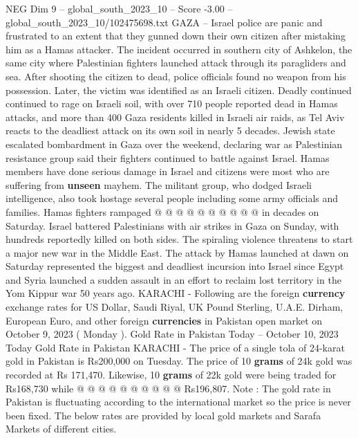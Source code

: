 \begin{textsample}{NEG Dim 9 – global\_south\_2023\_10 – Score -3.00 – global\_south\_2023\_10/102475698.txt}  \label{ex:f9_neg_416}
GAZA -- Israel police are panic and frustrated to an extent that they gunned down their own citizen after mistaking him as a Hamas attacker.
The incident occurred in southern city of Ashkelon, the same city where Palestinian fighters launched attack through its paragliders and sea.
After shooting the citizen to dead, police officials found no weapon from his possession.
Later, the victim was identified as an Israeli citizen.
Deadly continued continued to rage on Israeli soil, with over 710 people reported dead in Hamas attacks, and more than 400 Gaza residents killed in Israeli air raids, as Tel Aviv reacts to the deadliest attack on its own soil in nearly 5 decades.
Jewish state escalated bombardment in Gaza over the weekend, declaring war as Palestinian resistance group said their fighters continued to battle against Israel.
Hamas members have done serious damage in Israel and citizens were most who are suffering from \textbf{unseen} mayhem.
The militant group, who dodged Israeli intelligence, also took hostage several people including some army officials and families.
Hamas fighters rampaged @ @ @ @ @ @ @ @ @ @ in decades on Saturday.
Israel battered Palestinians with air strikes in Gaza on Sunday, with hundreds reportedly killed on both sides.
The spiraling violence threatens to start a major new war in the Middle East.
The attack by Hamas launched at dawn on Saturday represented the biggest and deadliest incursion into Israel since Egypt and Syria launched a sudden assault in an effort to reclaim lost territory in the Yom Kippur war 50 years ago.
KARACHI - Following are the foreign \textbf{currency} exchange rates for US Dollar, Saudi Riyal, UK Pound Sterling, U.A.E.
Dirham, European Euro, and other foreign \textbf{currencies} in Pakistan open market on October 9, 2023 ( Monday ).
Gold Rate in Pakistan Today -- October 10, 2023 Today Gold Rate in Pakistan KARACHI - The price of a single tola of 24-karat gold in Pakistan is Rs200,000 on Tuesday.
The price of 10 \textbf{grams} of 24k gold was recorded at Rs 171,470.
Likewise, 10 \textbf{grams} of 22k gold were being traded for Rs168,730 while @ @ @ @ @ @ @ @ @ @ Rs196,807.
Note : The gold rate in Pakistan is fluctuating according to the international market so the price is never been fixed.
The below rates are provided by local gold markets and Sarafa Markets of different cities.

\end{textsample}
